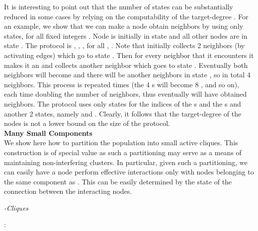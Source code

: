 \documentclass[oribibl, 11pt]{llncs}
\begin{document}
It is interesting to point out that the number of states can be substantially reduced in some cases by relying on the computability of the target-degree . For an example, we show that we can make a node  obtain  neighbors by using only  states, for all fixed integers . Node  is initially in state  and all other nodes are in state . The protocol is , , ,  for all , . Note that  initially collects 2 neighbors (by activating edges) which go to state . Then for every  neighbor that it encounters it makes it an  and collects another neighbor which goes to state . Eventually both  neighbors will become  and there will be another  neighbors in state , so in total 4  neighbors. This process is repeated  times (the 4 s will become 8 , and so on), each time doubling the number of neighbors, thus eventually  will have obtained  neighbors. The protocol uses only  states for the indices of the s and the s and another 2 states, namely  and . Clearly, it follows that the target-degree of the nodes is not a lower bound on the size of the protocol.\\

\noindent\textbf{Many Small Components}\\

We show here how to partition the population into small active cliques. This construction is of special value as such a partitioning may serve as a means of maintaining non-interfering clusters. In particular, given such a partitioning, we can easily have a node  perform effective interactions only with nodes belonging to the same component as . This can be easily determined by the state of the connection between the interacting nodes. 

\renewcommand{\algorithmiccomment}[1]{// #1}
\begin{algorithm}[!h]
  \caption{\emph{-Cliques}}\label{prot:cliques}
  \begin{algorithmic}
    \medskip
    \State 
    \State : 
    
  \end{algorithmic}
\end{algorithm}
\end{document}
